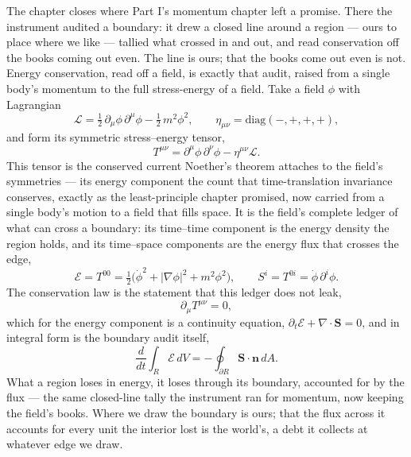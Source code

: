 The chapter closes where Part I's momentum chapter left a promise. There the instrument audited a boundary: it
drew a closed line around a region --- ours to place where we like --- tallied what crossed in and out, and
read conservation off the books coming out even. The line is ours; that the books come out even is not. Energy
conservation, read off a field, is exactly that audit, raised from a single body's momentum to the full
stress-energy of a field. Take a field $\phi$ with Lagrangian
\begin{equation}
  \mathcal{L} = \tfrac{1}{2}\,\partial_\mu\phi\,\partial^\mu\phi - \tfrac{1}{2}\,m^2\phi^2,
  \qquad \eta_{\mu\nu} = \mathrm{diag}(-,+,+,+),
\end{equation}
and form its symmetric stress--energy tensor,
\begin{equation}
  T^{\mu\nu} = \partial^\mu\phi\,\partial^\nu\phi - \eta^{\mu\nu}\mathcal{L} .
\end{equation}
This tensor is the conserved current Noether's theorem attaches to the field's symmetries --- its energy
component the count that time-translation invariance conserves, exactly as the least-principle chapter
promised, now carried from a single body's motion to a field that fills space. It is the field's complete
ledger of what can cross a boundary: its time--time component is the
energy density the region holds, and its time--space components are the energy flux that crosses the edge,
\begin{equation}
  \mathcal{E} = T^{00} = \tfrac{1}{2}\bigl(\dot\phi^2 + |\nabla\phi|^2 + m^2\phi^2\bigr),
  \qquad
  S^i = T^{0i} = \dot\phi\,\partial^i\phi .
\end{equation}
The conservation law is the statement that this ledger does not leak,
\begin{equation}
  \partial_\mu T^{\mu\nu} = 0,
\end{equation}
which for the energy component is a continuity equation, $\partial_t \mathcal{E} + \nabla\cdot\mathbf{S} = 0$,
and in integral form is the boundary audit itself,
\begin{equation}
  \frac{d}{dt}\int_R \mathcal{E}\, dV = -\oint_{\partial R} \mathbf{S}\cdot\mathbf{n}\, dA .
\end{equation}
What a region loses in energy, it loses through its boundary, accounted for by the flux --- the same
closed-line tally the instrument ran for momentum, now keeping the field's books. Where we draw the boundary is
ours; that the flux across it accounts for every unit the interior lost is the world's, a debt it collects at
whatever edge we draw.

